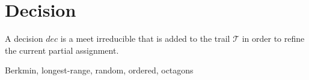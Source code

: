 \section{Decision}
A decision $dec$ is a meet irreducible that is added to the trail $\mathcal{T}$ 
in order to refine the current partial assignment.    

Berkmin, longest-range, random, ordered, octagons 
